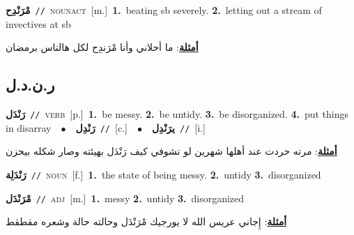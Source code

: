 \documentclass[10pt,a4paper,twoside]{article} %
\begin{document}
\begin{multicols}{2}
{\setlength\topsep{0pt}\textbf{\foreignlanguage{arabic}{مْرَنْدِح}}\ {\color{gray}\texttt{//}\color{black}}\ \textsc{noun\textunderscore act}\ [m.]\ \textbf{1.}~beating sb severely.  \textbf{2.}~letting out a stream of invectives at sb\  \begin{flushright}\color{gray}\foreignlanguage{arabic}{\textbf{\underline{\foreignlanguage{arabic}{أمثلة}}}: ما أحلاني وأنا مْرَندِح  لكل هالناس برمضان}\end{flushright}\color{black}} \vspace{2mm}

\vspace{-3mm}
\subsection*{\color{blue}\foreignlanguage{arabic}{ر.ن.د.ل}\color{blue}{}} 

{\setlength\topsep{0pt}\textbf{\foreignlanguage{arabic}{رَنْدَل}}\ {\color{gray}\texttt{//}\color{black}}\ \textsc{verb}\ [p.]\ \textbf{1.}~be messy.  \textbf{2.}~be untidy.  \textbf{3.}~be disorganized.  \textbf{4.}~put things in disarray\ \ $\bullet$\ \ \setlength\topsep{0pt}\textbf{\foreignlanguage{arabic}{رَنْدِل}}\ {\color{gray}\texttt{//}\color{black}}\ [c.]\ \ $\bullet$\ \ \setlength\topsep{0pt}\textbf{\foreignlanguage{arabic}{يرَنْدِل}}\ {\color{gray}\texttt{//}\color{black}}\ [i.]\  \begin{flushright}\color{gray}\foreignlanguage{arabic}{\textbf{\underline{\foreignlanguage{arabic}{أمثلة}}}: مرته حردت عند أهلها شهرين لو تشوفي كيف رَنْدَل بهيئته وصار شكله بيحزن}\end{flushright}\color{black}} \vspace{2mm}

{\setlength\topsep{0pt}\textbf{\foreignlanguage{arabic}{رَنْدَلِة}}\ {\color{gray}\texttt{//}\color{black}}\ \textsc{noun}\ [f.]\ \textbf{1.}~the state of being messy.  \textbf{2.}~untidy  \textbf{3.}~disorganized\ } \vspace{2mm}

{\setlength\topsep{0pt}\textbf{\foreignlanguage{arabic}{مْرَنْدَل}}\ {\color{gray}\texttt{//}\color{black}}\ \textsc{adj}\ [m.]\ \textbf{1.}~messy  \textbf{2.}~untidy  \textbf{3.}~disorganized\  \begin{flushright}\color{gray}\foreignlanguage{arabic}{\textbf{\underline{\foreignlanguage{arabic}{أمثلة}}}: إِجاني عريس الله لا يورجيك مْرَنْدَل وحالته حالة وشعره مقطقط}\end{flushright}\color{black}} \vspace{2mm}


\end{multicols}
\end{document}
